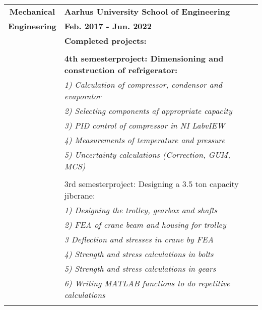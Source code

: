 \documentclass[letterpaper]{twentysecondcv} %
\begin{document}
\begin{tabular}{c|l}
\textbf{Mechanical}     & \textbf{Aarhus University School of Engineering}                  \\
\textbf{Engineering}    &  \textbf{Feb. 2017 - Jun. 2022}                                   \\
& \textbf{Completed projects:}                                                              \\ \\
& \hphantom{m} \textbf{4th semesterproject: Dimensioning and construction of refrigerator:} \\
        & \hphantom{mmm} \textit{1) Calculation of compressor, condensor and evaporator}    \\
        & \hphantom{mmm} \textit{2) Selecting components af appropriate capacity}           \\
        & \hphantom{mmm} \textit{3) PID control of compressor in NI LabvIEW}                \\
        & \hphantom{mmm} \textit{4) Measurements of temperature and pressure}               \\
        & \hphantom{mmm} \textit{5) Uncertainty calculations (Correction, GUM, MCS)}        \\ \\ 
& \hphantom{m}  3rd semesterproject: Designing a 3.5 ton capacity jibcrane:                 \\
        & \hphantom{mmm} \textit{1) Designing the trolley, gearbox and shafts}              \\
        & \hphantom{mmm} \textit{2) FEA of crane beam and housing for trolley}              \\
        & \hphantom{mmm} \textit{3 Deflection and stresses in crane by FEA}                 \\
        & \hphantom{mmm} \textit{4) Strength and stress calculations in bolts}              \\
        & \hphantom{mmm} \textit{5) Strength and stress calculations in gears}              \\
      & \hphantom{mmm} \textit{6) Writing MATLAB functions to do repetitive calculations}   \\ \\ 

\end{tabular}
\end{document}
